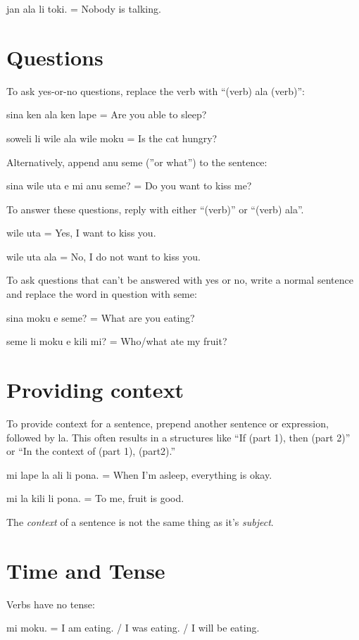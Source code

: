 \documentclass{article}
\begin{document}
\begin{multicols}{2}
\begin{ex}
  {\tpf jan ala li toki.} = Nobody is talking.
\end{ex}

\section*{Questions}
To ask yes-or-no questions, replace the verb with
“(verb) {\tpf ala} (verb)”:
\begin{ex}
  {\tpf sina ken ala ken lape} = Are you able to sleep?

  {\tpf soweli li wile ala wile moku} = Is the cat hungry?
\end{ex}

Alternatively, append {\tpf anu seme} (”or what”) to
the sentence:
\begin{ex}
  {\tpf sina wile uta e mi anu seme?} = Do you want to kiss me?
\end{ex}

To answer these questions, reply with either “(verb)” or
“(verb) {\tpf ala}”.
\begin{ex}
  {\tpf wile uta} = Yes, I want to kiss you.

  {\tpf wile uta ala} = No, I do not want to kiss you.
\end{ex}

To ask questions that can’t be answered with yes or no,
write a normal sentence and replace the word in question
with {\tpf seme}:
\begin{ex}
  {\tpf sina moku e seme?} = What are you eating?

  {\tpf seme li moku e kili mi?} = Who/what ate my fruit?
\end{ex}

\section*{Providing context}
To provide context for a sentence, prepend another
sentence or expression, followed by {\tpf la}.
This often results in a structures like
“If (part 1), then (part 2)” or “In the context of
(part 1), (part2).”
\begin{ex}
  {\tpf mi lape la ali li pona}. = When I’m asleep,
  everything is okay.

  {\tpf mi la kili li pona}. = To me, fruit is good.
\end{ex}

The \textit{context} of a sentence is not the same
thing as it's \textit{subject}.

\section*{Time and Tense}
Verbs have no tense:
\begin{ex}
  {\tpf mi moku.} = I am eating. / I was eating. / I will be eating.
\end{ex}


\end{multicols}
\end{document}
